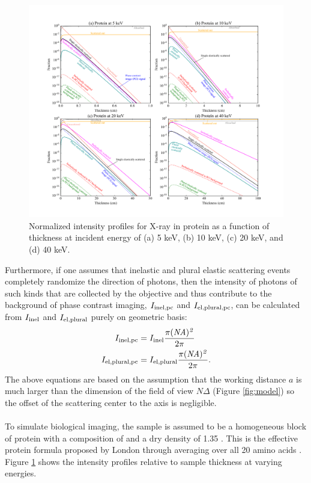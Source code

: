 \documentclass[]{article}
\newcommand\inel{\textup{\scriptsize{inel}}}
\newcommand\elpl{\textup{\scriptsize{el,plural}}}
\newcommand\inelpc{\textup{\scriptsize{inel,pc}}}
\newcommand\elplpc{\textup{\scriptsize{el,plural,pc}}}
\begin{document}
\begin{figure}[!t]
\begin{center}
\includegraphics[scale=.6]{unimatrix_fig.pdf}
\caption{Normalized intensity profiles for X-ray in protein as a function of thickness at incident energy of (a) 5 keV, (b) 10 keV, (c) 20 keV, and (d) 40 keV.}
\label{fig:protein_x_cate}
\end{center}
\end{figure}

Furthermore, if one assumes that inelastic and plural elastic scattering events completely randomize the direction of photons, then the intensity of photons of such kinds that are collected by the objective and thus contribute to the background of phase contrast imaging, $I_{\inelpc}$ and $I_{\elplpc}$, can be calculated from $I_{\inel}$ and $I_{\elpl}$ purely on geometric basis:
\begin{align}
I_{\inelpc} &= I_{\inel}\frac{\pi (\it{NA})^2}{2\pi} \\
I_{\elplpc} &= I_{\elpl}\frac{\pi (\it{NA})^2}{2\pi}.
\end{align}
The above equations are based on the assumption that the working distance $a$ is much larger than the dimension of the field of view $N\Delta$ (Figure \ref{fig:model}) so the offset of the scattering center to the axis is negligible. 

\paragraph{} To simulate biological imaging, the sample is assumed to be a homogeneous block of protein with a composition of  and a dry density of 1.35 . This is the effective protein formula proposed by London through averaging over all 20 amino acids \cite{London:1989hh}. Figure \ref{fig:protein_x_cate} shows the intensity profiles relative to sample thickness at varying energies. 
\end{document}
